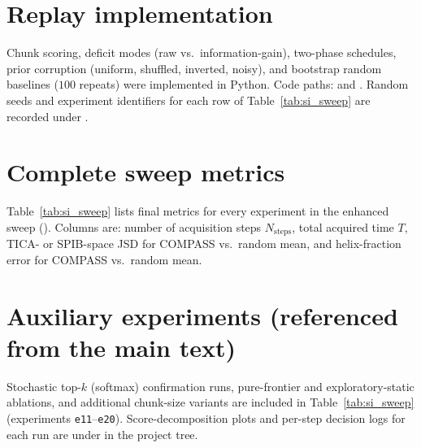 \documentclass[11pt]{article}
\begin{document}
\section{Replay implementation}

Chunk scoring, deficit modes (raw vs.\ information-gain), two-phase schedules, prior corruption (uniform, shuffled, inverted, noisy), and bootstrap random baselines ($100$ repeats) were implemented in Python.
Code paths:  and .
Random seeds and experiment identifiers for each row of Table~\ref{tab:si_sweep} are recorded under .

\section{Complete sweep metrics}

Table~\ref{tab:si_sweep} lists final metrics for every experiment in the enhanced sweep ().
Columns are: number of acquisition steps $N_{\mathrm{steps}}$, total acquired time $T$, TICA- or SPIB-space JSD for COMPASS vs.\ random mean, and helix-fraction error for COMPASS vs.\ random mean.

\bgroup\scriptsize\setlength{\tabcolsep}{2.5pt}

\egroup

\section{Auxiliary experiments (referenced from the main text)}

Stochastic top-$k$ (softmax) confirmation runs, pure-frontier and exploratory-static ablations, and additional chunk-size variants are included in Table~\ref{tab:si_sweep} (experiments \texttt{e11}--\texttt{e20}).
Score-decomposition plots and per-step decision logs for each run are under  in the project tree.



\end{document}
